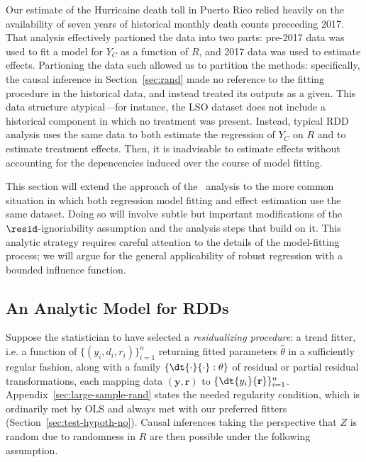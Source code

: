 Our estimate of the Hurricaine \maria death toll in Puerto Rico relied
heavily on the availability of seven years of historical monthly death
counts preceeding 2017.
That analysis effectively partioned the data into two parts: pre-2017
data was used to fit a model for $Y_C$ as a function of
$R$, and 2017 data was used to estimate effects.
Partioning the data such allowed us to partition the methods:
specifically, the causal inference in Section~\ref{sec:rand} made no
reference to the fitting procedure in the historical data, and instead
treated its outputs as a given.
This data structure atypical---for instance, the LSO dataset does not include a
historical component in which no treatment was present.
Instead, typical RDD analysis uses the same data to both estimate the
regression of $Y_C$ on $R$ and to estimate treatment effects.
Then, it is inadvisable to estimate effects without accounting for the
depencencies induced over the course of model fitting.

This section will extend the approach of the \maria\ analysis to the
more common situation in which both regression model fitting and
effect estimation use the same dataset.
Doing so will involve subtle but important modifications of the
$\resid$-ignoriability assumption and the analysis steps that build on
it.
This analytic strategy requires careful attention to the details of
the model-fitting process; we will argue for the general applicability
of robust regression with a bounded influence function.


\subsection{An Analytic Model for RDDs} \label{sec:model-eey-c-r}

Suppose the statistician to have selected a \textit{residualizing procedure}: a
trend fitter, i.e. a function of
$\{({y}_{i},d_{i},r_{i})\}_{i=1}^{n}$ returning
fitted parameters $\hat{\theta}$ in a sufficiently regular
fashion, along with a
family $\{\dt{\cdot}{\cdot}: \theta\}$ of residual or partial
residual transformations, each mapping data $(\mathbf{y}, \mathbf{r})$ to
$\{\dt {y_{i}}{\mathbf{r}} \}_{i=1}^{n}$.
Appendix~\ref{sec:large-sample-rand}
states the
needed regularity condition, which is ordinarily met by OLS and always
met with our preferred fitters (Section~\ref{sec:test-hypoth-no}).
Causal inferences taking
the perspective that $Z$ is random due to
randomness in $R$ are then possible under the following assumption.

